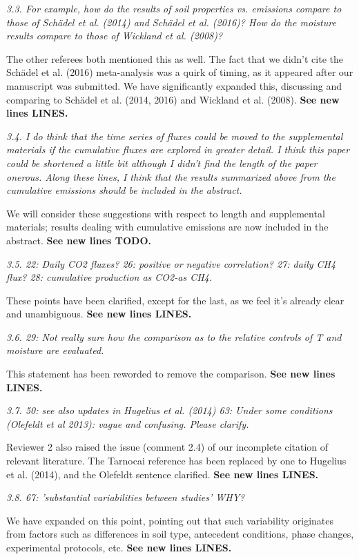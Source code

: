 \documentclass[11pt, oneside]{article}
\begin{document}
\medskip
{\it 3.3. For example, how do the results of soil properties vs. emissions compare to those of Schädel et al. (2014) and Schädel et al. (2016)? How do the moisture results compare to those of Wickland et al. (2008)? }

The other referees both mentioned this as well. The fact that we didn't cite the Schädel et al. (2016) meta-analysis was a quirk of timing, as it appeared after our manuscript was submitted. We have significantly expanded this, discussing and comparing to Schädel et al. (2014, 2016) and Wickland et al. (2008). {\bf See new lines LINES.}

\medskip
{\it 3.4. I do think that the time series of fluxes could be moved to the supplemental materials if the cumulative fluxes are explored in greater detail. I think this paper could be shortened a little bit although I didn't find the length of the paper onerous. Along these lines, I think that the results summarized above from the cumulative emissions should be included in the abstract. }

We will consider these suggestions with respect to length and supplemental materials; results dealing with cumulative emissions are now included in the abstract. {\bf See new lines TODO.}

\medskip
{\it 3.5. 22: Daily CO2 fluxes?
26: positive or negative correlation?
27: daily CH4 flux?
28: cumulative production as CO2-as CH4. }

These points have been clarified, except for the last, as we feel it's already clear and unambiguous. {\bf See new lines LINES.}

\medskip
{\it 3.6. 29: Not really sure how the comparison as to the relative controls of T and moisture are evaluated. }

This statement has been reworded to remove the comparison. {\bf See new lines LINES.}

\medskip
{\it 3.7. 50: see also updates in Hugelius et al. (2014)
63: Under some conditions (Olefeldt et al 2013): vague and confusing. Please clarify. }

Reviewer 2 also raised the issue (comment 2.4) of our incomplete citation of relevant literature. The Tarnocai reference has been replaced by one to Hugelius et al. (2014), and the Olefeldt sentence clarified. {\bf See new lines LINES.}

\medskip
{\it 3.8. 67: 'substantial variabilities between studies' WHY? }

We have expanded on this point, pointing out that such variability originates from factors such as differences in soil type, antecedent conditions, phase changes, experimental protocols, etc. {\bf See new lines LINES.}
\end{document}
